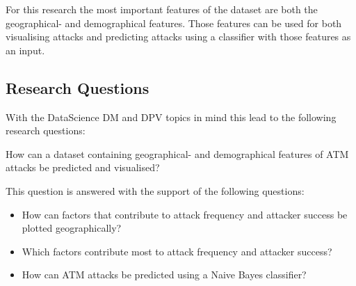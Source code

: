 \documentclass[conference]{IEEEtran}
\begin{document}
For this research the most important features of the dataset are both the geographical- and demographical features. Those features can be used for both visualising attacks and predicting attacks using a classifier with those features as an input.

\subsection{Research Questions} \label{questions}

With the DataScience DM and DPV topics in mind this lead to the following research questions:

\begin{displayquote}
	How can a dataset containing geographical- and demographical features of ATM attacks be predicted and visualised?
\end{displayquote}

This question is answered with the support of the following questions:  

\begin{itemize}
\item How can factors that contribute to attack frequency and attacker success be plotted geographically?
\item Which factors contribute most to attack frequency and attacker success?
\item How can ATM attacks be predicted using a Naive Bayes classifier?

\end{itemize}


%
%
\end{document}

